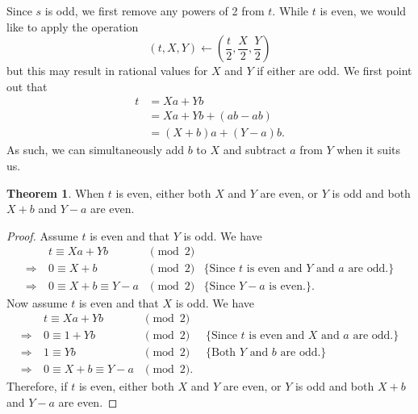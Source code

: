 \documentclass{ucalgthes1}
\theoremstyle{definition}
\newtheorem{thm}{Theorem}[section]
\begin{document}
Since $s$ is odd, we first remove any powers of 2 from $t$.  While $t$ is even, we would like to apply the operation
\[
(t, X, Y) \gets \left( \frac{t}{2}, \frac{X}{2}, \frac{Y}{2} \right)
\]
but this may result in rational values for $X$ and $Y$ if either are odd. We first point out that
\begin{align*}
	t &= Xa + Yb \\
	  &= Xa + Yb + (ab - ab) \\
	  &= (X+b)a + (Y-a)b.
\end{align*}
As such, we can simultaneously add $b$ to $X$ and subtract $a$ from $Y$ when it suits us.

\begin{thm}
\label{thm:addBSubA}
When $t$ is even, either both $X$ and $Y$ are even, or $Y$ is odd and both $X+b$ and $Y-a$ are even.
\end{thm}

\begin{proof}
Assume $t$ is even and that $Y$ is odd.  We have
\[
\begin{array}{rllr}
	         & t \equiv Xa + Yb & \pmod 2 \\
\Rightarrow~ & 0 \equiv X + b & \pmod 2 & \textrm{\{Since $t$ is even and $Y$ and $a$ are odd.\}} \\
\Rightarrow~ & 0 \equiv X + b \equiv Y - a & \pmod 2 & \textrm{\{Since $Y-a$ is even.\}}. 
\end{array}
\]
Now assume $t$ is even and that $X$ is odd.  We have
\[
\begin{array}{rllr}
	         & t \equiv Xa + Yb & \pmod 2 \\
\Rightarrow~ & 0 \equiv 1 + Yb & \pmod 2 & \textrm{ \{Since $t$ is even and $X$ and $a$ are odd.\}} \\
\Rightarrow~ & 1 \equiv Yb & \pmod 2 & \textrm{ \{Both $Y$ and $b$ are odd.\}} \\
\Rightarrow~ & 0 \equiv X + b \equiv Y - a & \pmod 2. 
\end{array}
\]
Therefore, if $t$ is even, either both $X$ and $Y$ are even, or $Y$ is odd and both $X+b$ and $Y-a$ are even.
\end{proof}
\end{document}
